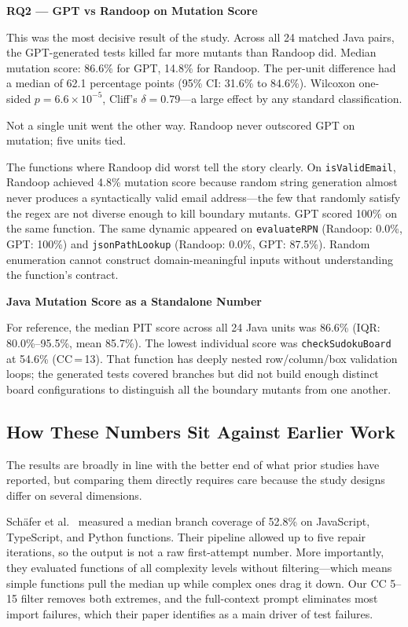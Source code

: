 \textbf{RQ2 --- GPT vs Randoop on Mutation Score}

This was the most decisive result of the study. Across all 24 matched Java pairs, the GPT-generated tests killed far more mutants than Randoop did. Median mutation score: 86.6\% for GPT, 14.8\% for Randoop. The per-unit difference had a median of 62.1 percentage points (95\% CI: 31.6\% to 84.6\%). Wilcoxon one-sided $p = 6.6\times10^{-5}$, Cliff's $\delta = 0.79$---a large effect by any standard classification.

Not a single unit went the other way. Randoop never outscored GPT on mutation; five units tied.

The functions where Randoop did worst tell the story clearly. On \texttt{isValidEmail}, Randoop achieved 4.8\% mutation score because random string generation almost never produces a syntactically valid email address---the few that randomly satisfy the regex are not diverse enough to kill boundary mutants. GPT scored 100\% on the same function. The same dynamic appeared on \texttt{evaluateRPN} (Randoop: 0.0\%, GPT: 100\%) and \texttt{jsonPathLookup} (Randoop: 0.0\%, GPT: 87.5\%). Random enumeration cannot construct domain-meaningful inputs without understanding the function's contract.

\textbf{Java Mutation Score as a Standalone Number}

For reference, the median PIT score across all 24 Java units was 86.6\% (IQR: 80.0\%--95.5\%, mean 85.7\%). The lowest individual score was \texttt{checkSudokuBoard} at 54.6\% (CC\,=\,13). That function has deeply nested row/column/box validation loops; the generated tests covered branches but did not build enough distinct board configurations to distinguish all the boundary mutants from one another.

\subsection{How These Numbers Sit Against Earlier Work}
\label{sec:disc-prior}

The results are broadly in line with the better end of what prior studies have reported, but comparing them directly requires care because the study designs differ on several dimensions.

Sch{\"a}fer et al.~\cite{schafer2024testpilot} measured a median branch coverage of 52.8\% on JavaScript, TypeScript, and Python functions. Their pipeline allowed up to five repair iterations, so the output is not a raw first-attempt number. More importantly, they evaluated functions of all complexity levels without filtering---which means simple functions pull the median up while complex ones drag it down. Our CC 5--15 filter removes both extremes, and the full-context prompt eliminates most import failures, which their paper identifies as a main driver of test failures.

